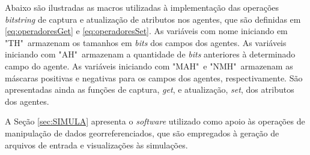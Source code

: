Abaixo são ilustradas as macros utilizadas à implementação das operações \textit{bitstring} de captura e atualização de atributos nos agentes, que são definidas em \ref{eq:operadoresGet} e \ref{eq:operadoresSet}. As variáveis com nome iniciando em "TH"\ armazenam os tamanhos em \textit{bits} dos campos dos agentes. As variáveis iniciando com "AH"\ armazenam a quantidade de \textit{bits} anteriores à determinado campo do agente. As variáveis iniciando com "MAH"\ e "NMH"\ armazenam as máscaras positivas e negativas para os campos dos agentes, respectivamente. São apresentadas ainda as funções de captura, \textit{get}, e atualização, \textit{set}, dos atributos dos agentes. 



A Seção \ref{sec:SIMULA} apresenta o \textit{software} utilizado como apoio às operações de manipulação de dados georreferenciados, que são empregados à geração de arquivos de entrada e visualizações às simulações.

\newpage